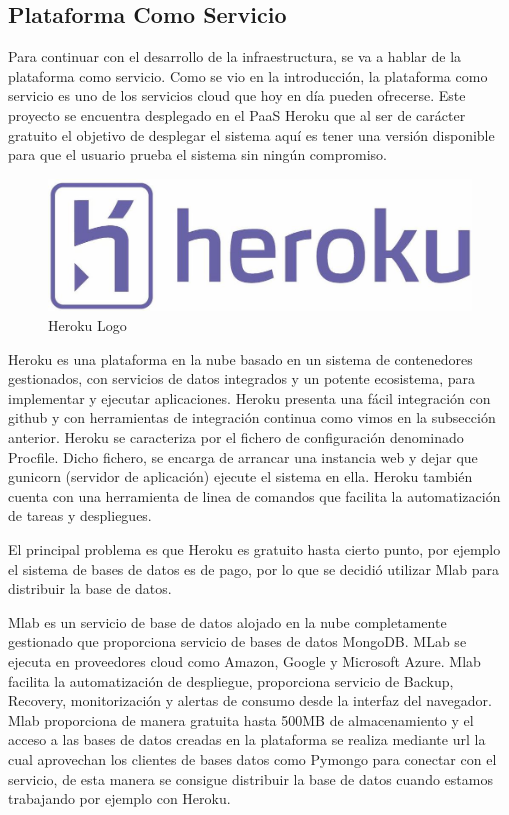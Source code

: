 \documentclass[a4paper,11pt]{book}
\begin{document}
\subsection{Plataforma Como Servicio}

Para continuar con el desarrollo de la infraestructura, se va a hablar de la plataforma como servicio. Como se vio en la introducción, la plataforma como servicio es uno de los servicios cloud que hoy en día pueden ofrecerse. Este proyecto se encuentra desplegado en el PaaS Heroku\cite{hero} que al ser de carácter gratuito el objetivo de desplegar el sistema aquí es tener una versión disponible para que el usuario prueba el sistema sin ningún compromiso.

\begin{figure}[H] 
\centering 
\includegraphics[scale=0.30]{imagenes/desarrollo_herramienta/heroku.jpg}
\caption{ Heroku Logo\cite{heroL}  }  
\end{figure}  	
 

Heroku es una plataforma en la nube basado en un sistema de contenedores gestionados, con servicios de datos integrados y un potente ecosistema, para implementar y ejecutar aplicaciones. Heroku presenta una fácil integración con github y con herramientas de integración continua como vimos en la subsección anterior. Heroku se caracteriza por el fichero de configuración denominado Procfile. Dicho fichero, se encarga de arrancar una instancia web y dejar que gunicorn (servidor de aplicación) ejecute el sistema en ella. Heroku también cuenta con una herramienta de linea de comandos que facilita la automatización de tareas y despliegues. 

El principal problema es que Heroku es gratuito hasta cierto punto, por ejemplo el sistema de bases de datos es de pago, por lo que se decidió utilizar Mlab para distribuir la base de datos.

Mlab\cite{mlab} es un servicio de base de datos alojado en la nube completamente gestionado que proporciona servicio de bases de datos MongoDB. MLab se ejecuta en proveedores cloud como Amazon, Google y Microsoft Azure. Mlab facilita la automatización de despliegue, proporciona servicio de Backup, Recovery, monitorización y alertas de consumo desde la interfaz del navegador. Mlab proporciona de manera gratuita hasta 500MB de almacenamiento y el acceso a las bases de datos creadas en la plataforma se realiza mediante url la cual aprovechan los clientes de bases datos como Pymongo para conectar con el servicio, de esta manera se consigue distribuir la base de datos cuando estamos trabajando por ejemplo con Heroku. 
\end{document}

